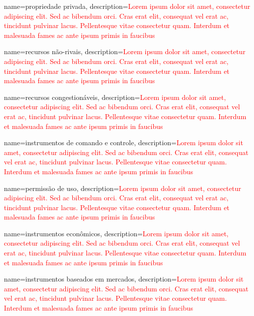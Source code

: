 {
	name=propriedade privada,
	description={\textcolor{red}{Lorem ipsum dolor sit amet, consectetur adipiscing elit. Sed ac bibendum orci. Cras erat elit, consequat vel erat ac, tincidunt pulvinar lacus. Pellentesque vitae consectetur quam. Interdum et malesuada fames ac ante ipsum primis in faucibus}}
}

{
	name=recursos não-rivais,
	description={\textcolor{red}{Lorem ipsum dolor sit amet, consectetur adipiscing elit. Sed ac bibendum orci. Cras erat elit, consequat vel erat ac, tincidunt pulvinar lacus. Pellentesque vitae consectetur quam. Interdum et malesuada fames ac ante ipsum primis in faucibus}}
}

{
	name=recursos congestionáveis,
	description={\textcolor{red}{Lorem ipsum dolor sit amet, consectetur adipiscing elit. Sed ac bibendum orci. Cras erat elit, consequat vel erat ac, tincidunt pulvinar lacus. Pellentesque vitae consectetur quam. Interdum et malesuada fames ac ante ipsum primis in faucibus}}
}

{
	name=instrumentos de comando e controle,
	description={\textcolor{red}{Lorem ipsum dolor sit amet, consectetur adipiscing elit. Sed ac bibendum orci. Cras erat elit, consequat vel erat ac, tincidunt pulvinar lacus. Pellentesque vitae consectetur quam. Interdum et malesuada fames ac ante ipsum primis in faucibus}}
}

{
	name=permissão de uso,
	description={\textcolor{red}{Lorem ipsum dolor sit amet, consectetur adipiscing elit. Sed ac bibendum orci. Cras erat elit, consequat vel erat ac, tincidunt pulvinar lacus. Pellentesque vitae consectetur quam. Interdum et malesuada fames ac ante ipsum primis in faucibus}}
}

{
	name=instrumentos econômicos,
	description={\textcolor{red}{Lorem ipsum dolor sit amet, consectetur adipiscing elit. Sed ac bibendum orci. Cras erat elit, consequat vel erat ac, tincidunt pulvinar lacus. Pellentesque vitae consectetur quam. Interdum et malesuada fames ac ante ipsum primis in faucibus}}
}

{
	name=instrumentos baseados em mercados,
	description={\textcolor{red}{Lorem ipsum dolor sit amet, consectetur adipiscing elit. Sed ac bibendum orci. Cras erat elit, consequat vel erat ac, tincidunt pulvinar lacus. Pellentesque vitae consectetur quam. Interdum et malesuada fames ac ante ipsum primis in faucibus}}
}

